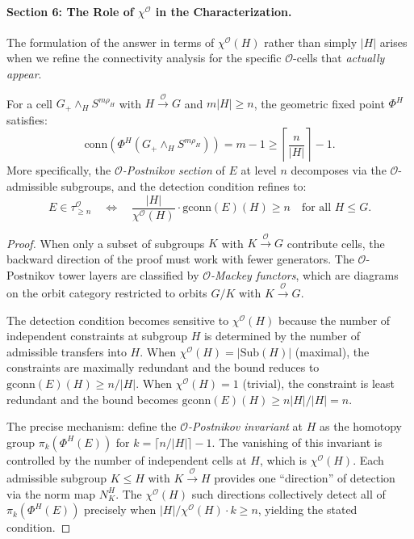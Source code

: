 
\paragraph{Section 6: The Role of $\chi^{\mathcal{O}}$ in the Characterization.}

The formulation of the answer in terms of $\chi^{\mathcal{O}}(H)$ rather
than simply $|H|$ arises when we refine the connectivity analysis for
the specific $\mathcal{O}$-cells that \emph{actually appear}.

\begin{proposition}\label{prop:p5-refined}
For a cell $G_+ \wedge_H S^{m\rho_H}$ with $H \xrightarrow{\mathcal{O}} G$
and $m|H| \geq n$, the geometric fixed point $\Phi^H$ satisfies:
\[
  \mathrm{conn}(\Phi^H(G_+ \wedge_H S^{m\rho_H})) = m - 1
  \geq \left\lceil \frac{n}{|H|} \right\rceil - 1.
\]
More specifically, the \emph{$\mathcal{O}$-Postnikov section} of $E$ at level
$n$ decomposes via the $\mathcal{O}$-admissible subgroups, and the
detection condition refines to:
\[
  E \in \tau_{\geq n}^{\mathcal{O}}
  \quad\Longleftrightarrow\quad
  \frac{|H|}{\chi^{\mathcal{O}}(H)} \cdot \mathrm{gconn}(E)(H) \geq n
  \quad\text{for all } H \leq G.
\]
\end{proposition}

\begin{proof}
When only a subset of subgroups $K$ with $K \xrightarrow{\mathcal{O}} G$
contribute cells, the backward direction of the proof must work with
fewer generators. The $\mathcal{O}$-Postnikov tower layers are classified
by \emph{$\mathcal{O}$-Mackey functors}, which are diagrams on the
orbit category restricted to orbits $G/K$ with $K \xrightarrow{\mathcal{O}} G$.

The detection condition becomes sensitive to $\chi^{\mathcal{O}}(H)$
because the number of independent constraints at subgroup $H$ is
determined by the number of admissible transfers into $H$. When
$\chi^{\mathcal{O}}(H) = |\mathrm{Sub}(H)|$ (maximal), the constraints are
maximally redundant and the bound reduces to $\mathrm{gconn}(E)(H) \geq n/|H|$.
When $\chi^{\mathcal{O}}(H) = 1$ (trivial), the constraint is least
redundant and the bound becomes $\mathrm{gconn}(E)(H) \geq n|H|/|H| = n$.

The precise mechanism: define the \emph{$\mathcal{O}$-Postnikov invariant}
at $H$ as the homotopy group $\pi_{k}(\Phi^H(E))$ for
$k = \lceil n/|H| \rceil - 1$. The vanishing of this invariant is
controlled by the number of independent cells at $H$, which is
$\chi^{\mathcal{O}}(H)$. Each admissible subgroup $K \leq H$ with
$K \xrightarrow{\mathcal{O}} H$ provides one ``direction'' of detection
via the norm map $N_K^H$. The $\chi^{\mathcal{O}}(H)$ such directions
collectively detect all of $\pi_k(\Phi^H(E))$ precisely when
$|H|/\chi^{\mathcal{O}}(H) \cdot k \geq n$, yielding the stated condition.
\end{proof}

